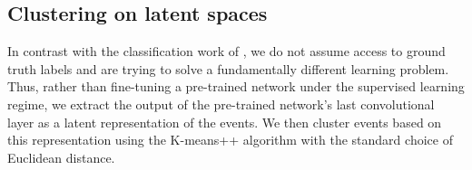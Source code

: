 \documentclass[review,number,sort&compress]{elsarticle}
\newcommand{\R}{\mathbb{R}}
\begin{document}
\subsection{Clustering on latent spaces}



In contrast with the classification work of \citet{Kuchera2019}, we do not assume access to ground truth labels and are trying to solve a fundamentally different learning problem. Thus, rather than fine-tuning a pre-trained network under the supervised learning regime, we extract the output of the pre-trained network's last convolutional layer as a latent representation of the events. We then cluster events based on this representation using the K-means++ algorithm with the standard choice of Euclidean distance.

\end{document}
